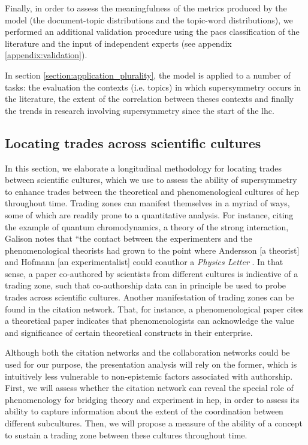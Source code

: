 \documentclass[smallextended]{svjour3}
\begin{document}
Finally, in order to assess the meaningfulness of the metrics produced by the model (the document-topic distributions and the topic-word distributions), we performed an additional validation procedure using the \gls{pacs} classification of the literature and the input of independent experts (see appendix \ref{appendix:validation}). 

In section \ref{section:application_plurality}, the model is applied to a number of tasks: the evaluation the contexts (i.e. topics) in which supersymmetry occurs in the literature, the extent of the correlation between theses contexts and finally the trends in research involving supersymmetry since the start of the \gls{lhc}.

\subsection{Locating trades across scientific cultures}\label{section:method_trading_zone}


In this section, we elaborate a longitudinal methodology for locating trades between scientific cultures, which we use to assess the ability of supersymmetry to enhance trades between the theoretical and phenomenological cultures of \gls{hep} throughout time. Trading zones can manifest themselves in a myriad of ways, some of which are readily prone to a quantitative analysis. %
For instance, citing the example of quantum chromodynamics, a theory of the strong interaction, Galison notes that ``the contact between the experimenters and the phenomenological theorists had grown to the point where Andersson [a theorist] and Hofmann [an experimentalist] could coauthor a \textit{Physics Letter} \citep[p.~655]{galison1997image}. In that sense, a paper co-authored by scientists from different cultures is indicative of a trading zone, such that co-authorship data can in principle be used to probe trades across scientific cultures. Another manifestation of trading zones can be found in the citation network. That, for instance, a phenomenological paper cites a theoretical paper indicates that phenomenologists can acknowledge the value and significance of certain theoretical constructs in their enterprise. 

Although both the citation networks and the collaboration networks could be used for our purpose, the presentation analysis will rely on the former, which is intuitively less vulnerable to non-epistemic factors associated with authorship. First, we will assess whether the citation  
 network can reveal the special role of phenomenology for bridging theory and experiment in \gls{hep}, in order to assess its ability to capture information about the extent of the coordination between different subcultures. Then, we will propose a measure of the ability of a concept to sustain a trading zone between these cultures throughout time.
\end{document}
